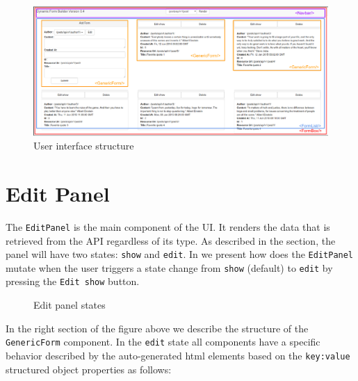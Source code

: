 \begin{figure}[H]
	\centering
		\includegraphics[scale=0.9, angle=90]{src/img/screenshot-app-0.pdf}
	\caption{User interface structure\label{img:main-view}}
\end{figure}

\section{Edit Panel}
\label{sec:edit-panel}

The \texttt{EditPanel} is the main component of the UI. It renders the data that is retrieved from the API regardless of its type. As described in the  section, the panel will have two states: \texttt{show} and \texttt{edit}. In  we present how does the \texttt{EditPanel} mutate when the user triggers a state change from \texttt{show} (default) to \texttt{edit} by pressing the \texttt{Edit show} button.

\begin{figure}[H]
	\centering
	\caption{Edit panel states\label{img:panels}}
\end{figure}


In the right section of the figure above we describe the structure of the \texttt{GenericForm} component. In the \texttt{edit} state all components have a specific behavior described by the auto-generated html elements based on the \texttt{key:value} structured object properties as follows:

